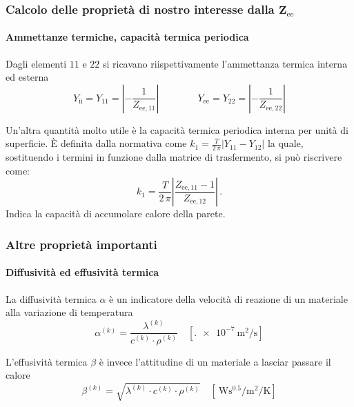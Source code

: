 \documentclass[aspectratio=141,10pt]{beamer}
\newcommand{\e}{\`E\xspace}  %
\begin{document}
\begin{frame}
    \frametitle{Calcolo delle proprietà di nostro interesse dalla $\mathbf{Z}_{\text{ee}}$}
\framesubtitle{Ammettanze termiche, capacità termica periodica}



Dagli elementi {\footnotesize $11$} e {\footnotesize $22$} si ricavano riispettivamente l'ammettanza termica interna ed esterna 
\begin{equation*}
    Y_{\text{ii}}=Y_{11} = \left\lvert -\frac{1}{Z_{\text{ee},11}}\right\rvert \qquad \qquad
    Y_{\text{ee}}=Y_{22} = \left\lvert -\frac{1}{Z_{\text{ee},22}}\right\rvert 
\end{equation*}     

Un'altra quantità molto utile è la capacità termica periodica interna per unità di superficie. \e definita dalla normativa come $k_1 = \frac{T}{2\,\pi} \left\lvert Y_{11} - Y_{12}\right\rvert$ la quale, sostituendo i termini in funzione dalla matrice di trasfermento, si può riscrivere come:
\begin{equation*}
    k_1 = \frac{T}{2\,\pi} \left\lvert \frac{Z_{\text{ee},11} - 1}{Z_{\text{ee},12}}\right\rvert\,.
\end{equation*}
Indica la capacità di accumolare calore della parete.
\end{frame}
\begin{frame}
    \frametitle{Altre proprietà importanti}
    \framesubtitle{Diffusività ed effusività termica}

    La diffusività termica $\alpha$ è un indicatore della velocità di reazione di un materiale alla variazione di temperatura
    \begin{equation*}
        \alpha^{(k)} = \dfrac{\lambda^{(k)}}{c^{(k)} \cdot \rho^{(k)}} \quad \left[\SI{.e-7}{\metre\squared\per\second}\right]
    \end{equation*}
    \vspace{1cm}

    L'effusività termica $\beta$ è invece l'attitudine di un materiale a lasciar passare il calore
    \begin{equation*}
        \beta^{(k)} = \sqrt{\lambda^{(k)} \cdot c^{(k)} \cdot \rho^{(k)}} \quad \left[\SI{}{\watt\second\tothe{0.5}\per\metre\squared\per\kelvin}\right]
    \end{equation*}


\end{frame}
\end{document}
